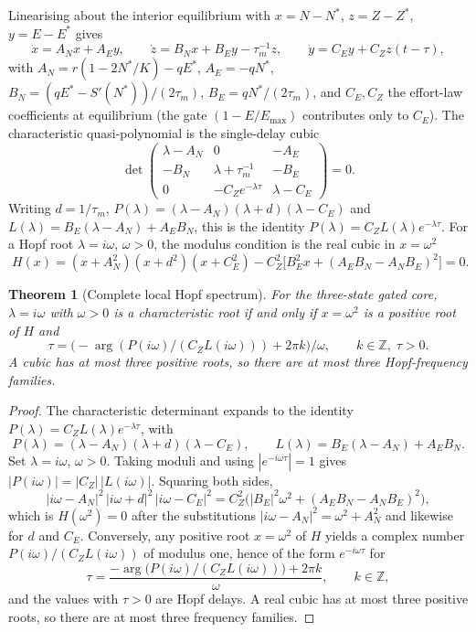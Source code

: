 \documentclass[11pt]{article}
\newtheorem{theorem}{Theorem}
\theoremstyle{definition}
\begin{document}
Linearising about the interior equilibrium with $x=N-N^*$, $z=Z-Z^*$, $y=E-E^*$ gives
\[
\dot x=A_N x+A_E y,\qquad
\dot z=B_N x+B_E y-\tau_m^{-1}z,\qquad
\dot y=C_E y+C_Z z(t-\tau),
\]
with $A_N=r(1-2N^*/K)-qE^*$, $A_E=-qN^*$, $B_N=(qE^*-S'(N^*))/(2\tau_m)$, $B_E=qN^*/(2\tau_m)$, and $C_E,C_Z$ the effort-law coefficients at equilibrium (the gate $(1-E/E_{\max})$ contributes only to $C_E$). The characteristic quasi-polynomial is the single-delay cubic
\begin{equation}
\det\begin{pmatrix}\lambda-A_N&0&-A_E\\-B_N&\lambda+\tau_m^{-1}&-B_E\\0&-C_Z e^{-\lambda\tau}&\lambda-C_E\end{pmatrix}=0.
\label{eq:char}
\end{equation}
Writing $d=1/\tau_m$, $P(\lambda)=(\lambda-A_N)(\lambda+d)(\lambda-C_E)$ and $L(\lambda)=B_E(\lambda-A_N)+A_E B_N$, this is the identity $P(\lambda)=C_Z L(\lambda)e^{-\lambda\tau}$. For a Hopf root $\lambda=i\omega$, $\omega>0$, the modulus condition is the real cubic in $x=\omega^2$
\begin{equation}
\boxed{\;H(x)=(x+A_N^2)(x+d^2)(x+C_E^2)-C_Z^2\bigl[B_E^2 x+(A_E B_N-A_N B_E)^2\bigr]=0.\;}
\label{eq:hopf-cubic}
\end{equation}
\begin{theorem}[Complete local Hopf spectrum]
\label{thm:hopf-cubic-complete}
For the three-state gated core, $\lambda=i\omega$ with $\omega>0$ is a characteristic root if and only if $x=\omega^2$ is a positive root of $H$ and
\[
\tau=\bigl(-\arg(P(i\omega)/(C_Z L(i\omega)))+2\pi k\bigr)/\omega,
\qquad k\in\mathbb Z,\;\tau>0.
\]
A cubic has at most three positive roots, so there are at most three Hopf-frequency families.
\end{theorem}

\begin{proof}
The characteristic determinant expands to the identity $P(\lambda)=C_Z L(\lambda)e^{-\lambda\tau}$, with
\[
P(\lambda)=(\lambda-A_N)(\lambda+d)(\lambda-C_E),\qquad
L(\lambda)=B_E(\lambda-A_N)+A_E B_N.
\]
Set $\lambda=i\omega$, $\omega>0$. Taking moduli and using $|e^{-i\omega\tau}|=1$ gives $|P(i\omega)|=|C_Z|\,|L(i\omega)|$. Squaring both sides,
\[
|i\omega-A_N|^2\,|i\omega+d|^2\,|i\omega-C_E|^2
=C_Z^2\bigl(|B_E|^2\omega^2+(A_E B_N-A_N B_E)^2\bigr),
\]
which is $H(\omega^2)=0$ after the substitutions $|i\omega-A_N|^2=\omega^2+A_N^2$ and likewise for $d$ and $C_E$. Conversely, any positive root $x=\omega^2$ of $H$ yields a complex number $P(i\omega)/(C_Z L(i\omega))$ of modulus one, hence of the form $e^{-i\omega\tau}$ for
\[
\tau=\frac{-\arg\bigl(P(i\omega)/(C_Z L(i\omega))\bigr)+2\pi k}{\omega},\qquad k\in\mathbb Z,
\]
and the values with $\tau>0$ are Hopf delays. A real cubic has at most three positive roots, so there are at most three frequency families.
\end{proof}
\end{document}
